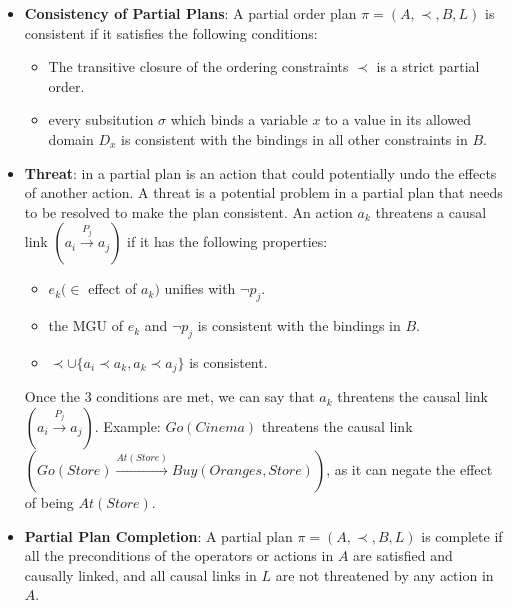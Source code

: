 \begin{itemize}
  \item  \label{def:consistency_partial_plan}
        \textbf{Consistency of Partial Plans}: A partial order plan $\pi = (A, \prec, B, L)$ is consistent if it satisfies the following conditions: \cite{10.5555/975615}
        \begin{itemize}
          \item The transitive closure of the ordering constraints $\prec$ is a strict partial order.
          \item every subsitution $\sigma $ which binds a variable $x$ to a value in its allowed domain $D_x$ is consistent with the bindings in all other constraints in $B$.
        \end{itemize}


  \item  \label{def:threat}
        \textbf{Threat}: in a partial plan is an action that could potentially undo the effects of another action. A threat is a potential problem in a partial plan that needs to be resolved to make the plan consistent. An action $a_k$ threatens a causal link $(a_i \xrightarrow{\text{$P_j$}}  a_j)$ if it has the following properties: \cite{10.5555/975615}
        \begin{itemize}
          \item $e_k (\in$ effect of $a_k)$ unifies with $\lnot p_j$.
          \item the \ac{MGU} of $e_k$ and $\lnot p_j$ is consistent with the bindings in $B$.
          \item $\prec \cup \{a_i \prec a_k, a_k \prec a_j\}$ is consistent.
        \end{itemize}
        Once the 3 conditions are met, we can say that $a_k$ threatens the causal link $(a_i \xrightarrow{\text{$P_j$}}  a_j)$.
        Example: $Go(Cinema)$ threatens the causal link $(Go(Store) \xrightarrow{\text{$At(Store)$}} Buy(Oranges,Store))$, as it can negate the effect of being $At(Store)$.

  \item  \label{def:partial_plan_completion}
        \textbf{Partial Plan Completion}: A partial plan $\pi = (A, \prec, B, L)$ is complete if all the preconditions of the operators or actions in $A$ are satisfied and causally linked, and all causal links in $L$ are not threatened by any action in $A$. \cite{10.5555/975615}

\end{itemize}








